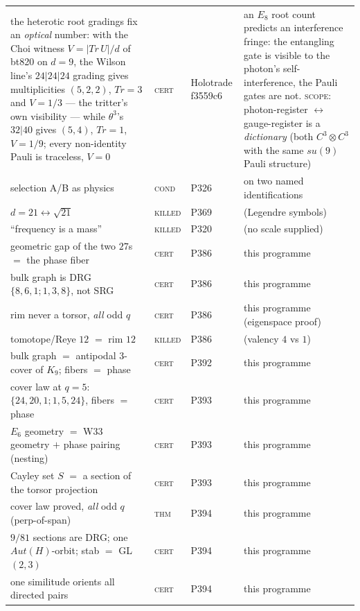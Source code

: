 \documentclass[12pt,a4paper]{article}
\def\mathbb#1{#1}%
\def\mathrm#1{#1}%
\def\mathfrak#1{#1}%
\def\texttt#1{#1}%
\theoremstyle{definition}
\newcommand{\CC}{\mathbb{C}}
\begin{document}
\begin{center}
\begin{tabular}{@{}p{}llp{}@{}}
the heterotic root gradings fix an \emph{optical} number: with the Choi witness $V=|\mathrm{Tr}\,U|/d$ of \texttt{bt820} on $d=9$, the Wilson line's $24|24|24$ grading gives multiplicities $(5,2,2)$, $\mathrm{Tr}=3$ and $V=1/3$ --- the tritter's own visibility --- while $\theta^3$'s $32|40$ gives $(5,4)$, $\mathrm{Tr}=1$, $V=1/9$; every non-identity Pauli is traceless, $V=0$ & \textsc{cert} & Holotrade \texttt{f3559c6} & an $E_8$ root count predicts an interference fringe: the entangling gate is visible to the photon's self-interference, the Pauli gates are not. \textsc{scope}: photon-register $\leftrightarrow$ gauge-register is a \emph{dictionary} (both $\CC^3\otimes\CC^3$ with the same $\mathfrak{su}(9)$ Pauli structure) \\
selection A/B as physics & \textsc{cond} & P326 & on two named identifications \\
$d=21\leftrightarrow\sqrt{21}$ & \textsc{killed} & P369 & (Legendre symbols) \\
``frequency is a mass'' & \textsc{killed} & P320 & (no scale supplied) \\
geometric gap of the two $27$s $=$ the phase fiber & \textsc{cert} & P386 & this programme \\
bulk graph is DRG $\{8,6,1;1,3,8\}$, not SRG & \textsc{cert} & P386 & this programme \\
rim never a torsor, \emph{all} odd $q$ & \textsc{cert} & P386 & this programme (eigenspace proof) \\
tomotope/Reye $12$ $=$ rim $12$ & \textsc{killed} & P386 & (valency $4$ vs $1$) \\
bulk graph $=$ antipodal $3$-cover of $K_9$; fibers $=$ phase & \textsc{cert} & P392 & this programme \\
cover law at $q=5$: $\{24,20,1;1,5,24\}$, fibers $=$ phase & \textsc{cert} & P393 & this programme \\
$E_6$ geometry $=$ W33 geometry $+$ phase pairing (nesting) & \textsc{cert} & P393 & this programme \\
Cayley set $S$ $=$ a section of the torsor projection & \textsc{cert} & P393 & this programme \\
cover law proved, \emph{all} odd $q$ (perp-of-span) & \textsc{thm} & P394 & this programme \\
$9/81$ sections are DRG; one $\mathrm{Aut}(H)$-orbit; stab $=$ GL$(2,3)$ & \textsc{cert} & P394 & this programme \\
one similitude orients all directed pairs & \textsc{cert} & P394 & this programme \\

\end{tabular}
\end{center}
\end{document}
